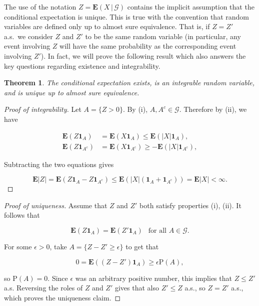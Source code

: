 \documentclass[11pt]{report}
\theoremstyle{plain}
\newtheorem{thm}{Theorem}[chapter]
\theoremstyle{definition}
\begin{document}
The use of the notation $Z = \mathbf{E}\left(X\,|\,\mathcal{G}\right)$ contains the implicit assumption that the conditional expectation is unique. This is true with the convention that random variables are defined only up to almost sure equivalence. That is, if $Z=Z'$ a.s.\ we consider $Z$ and $Z'$ to be the same random variable (in particular, any event involving $Z$ will have the same probability as the corresponding event involving $Z'$). In fact, we will prove the following result which also answers the key questions regarding existence and integrability.

\begin{thm}
\label{thm-cond-ext}
The conditional expectation exists, is an integrable random variable, and is unique up to almost sure equivalence.
\end{thm}

\begin{proof}[Proof of integrability]
Let $A = \{ Z>0 \}$. By (i), $A, A^c \in \mathcal{G}$. Therefore by (ii), we have

\begin{align*}
\mathbf{E}(Z \mathbf{1}_A) &= \mathbf{E}(X \mathbf{1}_A) \le \mathbf{E}\left( |X| \mathbf{1}_A \right), \\
\mathbf{E}(Z \mathbf{1}_{A^c}) &= \mathbf{E}(X \mathbf{1}_{A^c}) \ge -\mathbf{E}\left( |X| \mathbf{1}_{A^c} \right),
\end{align*}

Subtracting the two equations gives

\[
\mathbf{E}|Z| = \mathbf{E}(Z\mathbf{1}_A - Z\mathbf{1}_{A^c}) \le \mathbf{E}\left( |X| (\mathbf{1}_A + \mathbf{1}_{A^c}) \right) = \mathbf{E}|X| < \infty.
\]

\end{proof}

\begin{proof}[Proof of uniqueness]
Assume that $Z$ and $Z'$ both satisfy properties (i), (ii). It follows that

\[
\mathbf{E}(Z \mathbf{1}_A) = \mathbf{E}(Z' \mathbf{1}_A)\ \  \textrm{ for all }A \in \mathcal{G}.
\]

For some $\epsilon>0$, take $A = \{ Z-Z' \ge \epsilon \}$ to get that

\[
0 = \mathbf{E}( (Z-Z')\mathbf{1}_A ) \ge \epsilon \mathrm{P}(A),
\]

so $\mathrm{P}(A) = 0$. Since $\epsilon$ was an arbitrary positive number, this implies that $Z\le Z'$ a.s. Reversing the roles of $Z$ and $Z'$ gives that also $Z'\le Z$ a.s., so $Z=Z'$ a.s., which proves the uniqueness claim.
\end{proof}
\end{document}
